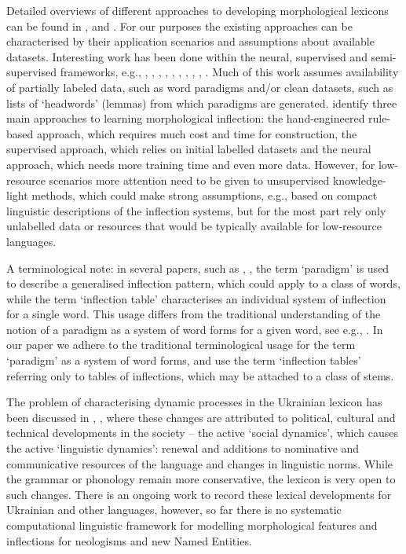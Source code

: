 \documentclass[11pt,a4paper]{article}
\begin{document}
Detailed overviews of different approaches to developing morphological lexicons can be found in \cite{ahlberg2015paradigm}, \cite{koskenniemi2018guessing} and  \cite{fam2018ips}. For our purposes the existing approaches can be characterised by their application scenarios and assumptions about available datasets. Interesting work has been done within the neural, supervised and semi-supervised frameworks, e.g., \cite{ahlberg2015paradigm}, \cite{hulden2014semi}, \cite{koskenniemi2018guessing}, \cite{silfverberg2018computational}, \cite{wolf2018structured}, \cite{kirov2018recurrent}, \cite{faruqui2016morpho}, \cite{faruqui2015morphological}, \cite{aharoni2016morphological}, \cite{cotterell2017paradigm}. Much of this work assumes availability of partially labeled data, such as word paradigms and/or clean datasets, such as lists of `headwords' (lemmas) from which paradigms are generated. \cite{fam2018ips} identify three main approaches to learning morphological inflection: the hand-engineered rule-based approach, which requires much cost and time for construction, the supervised approach, which relies on initial labelled datasets and the neural approach, which needs more training time and even more data. However, for low-resource scenarios more attention need to be given to unsupervised knowledge-light methods, which could make strong assumptions, e.g., based on compact  linguistic descriptions of the inflection systems, but for the most part rely only unlabelled data or resources that would be typically available for low-resource languages.

A terminological note: in several papers, such as \cite{ahlberg2015paradigm}, \cite{silfverberg2018computational}, the term `paradigm' is used to describe a generalised inflection pattern, which could apply to a class of words, while the term `inflection table' characterises an individual system of inflection for a single word. This usage differs from the traditional understanding of the notion of a paradigm as a system of word forms for a given word, see e.g., \cite{spencer2001paradigm}. In our paper we adhere to the traditional terminological usage for the term `paradigm' as a system of word forms, and use the term `inflection tables' referring only to tables of inflections, which may be attached to a class of stems.

The problem of characterising dynamic processes in the Ukrainian lexicon has been discussed in \cite{klymenko2008dynamichni}, \cite{karpilovska2013aktyvni}, where these changes are attributed to political, cultural and technical developments in the society -- the active `social dynamics', which causes the active `linguistic dynamics': renewal and additions to nominative and communicative resources of the language and changes in linguistic norms. While the grammar or phonology remain more conservative, the lexicon is very open to such changes. There is an ongoing work to record these lexical developments for Ukrainian and other languages, however, so far there is no systematic computational linguistic framework for modelling morphological features and inflections for neologisms and new Named Entities.
\end{document}
